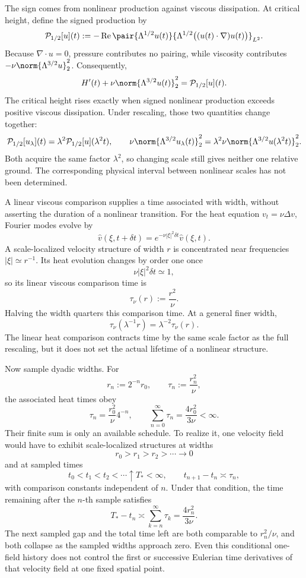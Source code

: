 
The sign comes from nonlinear production against viscous dissipation. At critical height, define the signed production by
\[
  \mathcal P_{1/2}[u](t)
  :=
  -\operatorname{Re}
  \pair
    {\Lambda^{1/2}u(t)}
    {\Lambda^{1/2}\bigl((u(t)\cdot\nabla)u(t)\bigr)}_{L^2}.
\]
Because \(\nabla\cdot u=0\), pressure contributes no pairing, while viscosity contributes \(-\nu\norm{\Lambda^{3/2}u}_2^2\). Consequently,
\[
  H'(t)
  +
  \nu\norm{\Lambda^{3/2}u(t)}_2^2
  =
  \mathcal P_{1/2}[u](t).
\]
The critical height rises exactly when signed nonlinear production exceeds positive viscous dissipation. Under rescaling, those two quantities change together:
\[
  \mathcal P_{1/2}[u_\lambda](t)
  =
  \lambda^2\mathcal P_{1/2}[u](\lambda^2t),
  \qquad
  \nu\norm{\Lambda^{3/2}u_\lambda(t)}_2^2
  =
  \lambda^2\nu\norm{\Lambda^{3/2}u(\lambda^2t)}_2^2.
\]
Both acquire the same factor \(\lambda^2\), so changing scale still gives neither one relative ground. The corresponding physical interval between nonlinear scales has not been determined.


A linear viscous comparison supplies a time associated with width, without asserting the duration of a nonlinear transition. For the heat equation \(v_t=\nu\Delta v\), Fourier modes evolve by
\[
  \widehat v(\xi,t+\delta t)
  =
  e^{-\nu|\xi|^2\delta t}\widehat v(\xi,t).
\]
A scale-localized velocity structure of width \(r\) is concentrated near frequencies \(|\xi|\simeq r^{-1}\). Its heat evolution changes by order one once
\[
  \nu|\xi|^2\delta t\simeq1,
\]
so its linear viscous comparison time is
\[
  \tau_\nu(r)
  :=
  \frac{r^2}{\nu}.
\]
Halving the width quarters this comparison time. At a general finer width,
\[
  \tau_\nu(\lambda^{-1}r)
  =
  \lambda^{-2}\tau_\nu(r).
\]
The linear heat comparison contracts time by the same scale factor as the full \NavierStokes{} rescaling, but it does not set the actual lifetime of a nonlinear structure.


Now sample dyadic widths. For
\[
  r_n:=2^{-n}r_0,
  \qquad
  \tau_n:=\frac{r_n^2}{\nu},
\]
the associated heat times obey
\[
  \tau_n
  =
  \frac{r_0^2}{\nu}4^{-n},
  \qquad
  \sum_{n=0}^{\infty}\tau_n
  =
  \frac{4r_0^2}{3\nu}
  <
  \infty.
\]
Their finite sum is only an available schedule. To realize it, one \NavierStokes{} velocity field would have to exhibit scale-localized structures at widths
\[
  r_0>r_1>r_2>\cdots\longrightarrow0
\]
and at sampled times
\[
  t_0<t_1<t_2<\cdots\uparrow T_*<\infty,
  \qquad
  t_{n+1}-t_n\asymp\tau_n,
\]
with comparison constants independent of \(n\). Under that condition, the time remaining after the \(n\)-th sample satisfies
\[
  T_*-t_n
  \asymp
  \sum_{k=n}^{\infty}\tau_k
  =
  \frac{4r_n^2}{3\nu}.
\]
The next sampled gap and the total time left are both comparable to \(r_n^2/\nu\), and both collapse as the sampled widths approach zero. Even this conditional one-field history does not control the first or successive Eulerian time derivatives of that velocity field at one fixed spatial point.